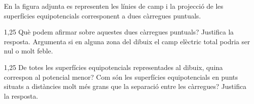 En la figura adjunta es representen les línies de camp i la projecció de les superfícies equipotencials corresponent a dues càrregues puntuals.


\begin{apartat}{1,25}
Què podem afirmar sobre aquestes dues càrregues puntuals? Justifica la resposta. Argumenta si en alguna zona del dibuix el camp elèctric total podria ser nul o molt feble.
\end{apartat}

\begin{apartat}{1,25}
De totes les superfícies equipotencials representades al dibuix, quina correspon al potencial menor? Com són les superfícies equipotencials en punts situats a distàncies molt més grans que la separació entre les càrregues? Justifica la resposta.
\end{apartat}
